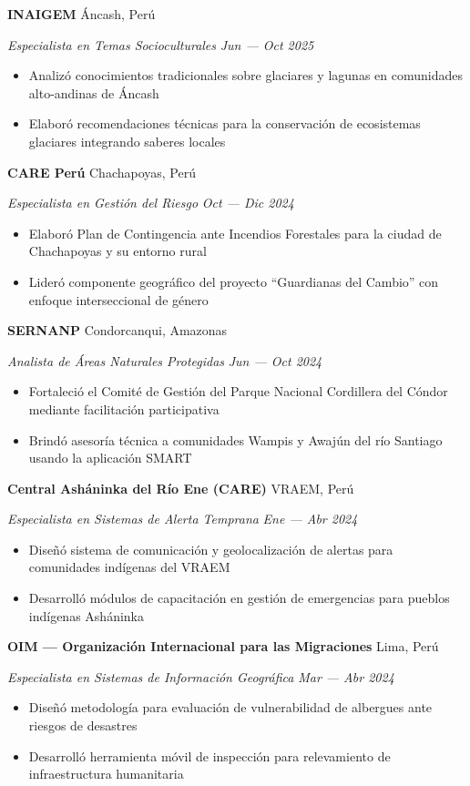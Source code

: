 \documentclass[11pt,letterpaper]{article}
\newcommand{\entry}[4]{%
  \noindent\textbf{#1} \hfill #2 \par\nopagebreak
  \textit{#3} \hfill \textit{#4} \par\nopagebreak
}
\begin{document}
\entry{INAIGEM}{\'Ancash, Per\'u}{Especialista en Temas Socioculturales}{Jun --- Oct 2025}
\begin{itemize}
  \item Analiz\'o conocimientos tradicionales sobre glaciares y lagunas en comunidades alto-andinas de \'Ancash
  \item Elabor\'o recomendaciones t\'ecnicas para la conservaci\'on de ecosistemas glaciares integrando saberes locales
\end{itemize}
\vspace{0.3em}

\entry{CARE Per\'u}{Chachapoyas, Per\'u}{Especialista en Gesti\'on del Riesgo}{Oct --- Dic 2024}
\begin{itemize}
  \item Elabor\'o Plan de Contingencia ante Incendios Forestales para la ciudad de Chachapoyas y su entorno rural
  \item Lider\'o componente geogr\'afico del proyecto ``Guardianas del Cambio'' con enfoque interseccional de g\'enero
\end{itemize}
\vspace{0.3em}

\entry{SERNANP}{Condorcanqui, Amazonas}{Analista de \'Areas Naturales Protegidas}{Jun --- Oct 2024}
\begin{itemize}
  \item Fortaleci\'o el Comit\'e de Gesti\'on del Parque Nacional Cordillera del C\'ondor mediante facilitaci\'on participativa
  \item Brind\'o asesor\'ia t\'ecnica a comunidades Wampis y Awaj\'un del r\'io Santiago usando la aplicaci\'on SMART
\end{itemize}
\vspace{0.3em}

\entry{Central Ash\'aninka del R\'io Ene (CARE)}{VRAEM, Per\'u}{Especialista en Sistemas de Alerta Temprana}{Ene --- Abr 2024}
\begin{itemize}
  \item Dise\~n\'o sistema de comunicaci\'on y geolocalizaci\'on de alertas para comunidades ind\'igenas del VRAEM
  \item Desarroll\'o m\'odulos de capacitaci\'on en gesti\'on de emergencias para pueblos ind\'igenas Ash\'aninka
\end{itemize}
\vspace{0.3em}

\entry{OIM --- Organizaci\'on Internacional para las Migraciones}{Lima, Per\'u}{Especialista en Sistemas de Informaci\'on Geogr\'afica}{Mar --- Abr 2024}
\begin{itemize}
  \item Dise\~n\'o metodolog\'ia para evaluaci\'on de vulnerabilidad de albergues ante riesgos de desastres
  \item Desarroll\'o herramienta m\'ovil de inspecci\'on para relevamiento de infraestructura humanitaria
\end{itemize}
\vspace{0.3em}
\end{document}
